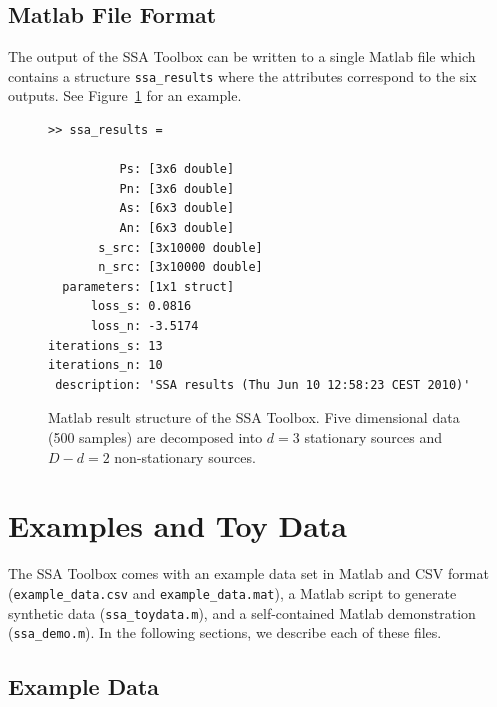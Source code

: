 \documentclass{article}
\newcommand{\1}{\ensuremath{\mathds{1}}}
\newcommand{\0}{\ensuremath{0}}
\begin{document}
\subsection{Matlab File Format}

The output of the SSA Toolbox can be written to a single Matlab file which contains
a structure \texttt{ssa\_results} where the attributes correspond to the six outputs. 
See Figure~\ref{fig:ex_matlab_res} for an example.

\begin{figure}[h]
\centering
\begin{boxedminipage}{12cm}
\begin{verbatim}
>> ssa_results = 

          Ps: [3x6 double]
          Pn: [3x6 double]
          As: [6x3 double]
          An: [6x3 double]
       s_src: [3x10000 double]
       n_src: [3x10000 double]
  parameters: [1x1 struct]
      loss_s: 0.0816
      loss_n: -3.5174
iterations_s: 13
iterations_n: 10
 description: 'SSA results (Thu Jun 10 12:58:23 CEST 2010)'
\end{verbatim}
\end{boxedminipage}
\caption{
Matlab result structure of the SSA Toolbox. Five dimensional data (500 samples) 
are decomposed into $d = 3$ stationary sources and $D-d = 2$ non-stationary sources.
\label{fig:ex_matlab_res}
}
\end{figure}

\FloatBarrier %

\section{Examples and Toy Data}

The SSA Toolbox comes with an example data set in Matlab and CSV format (\texttt{example\_data.csv} and \texttt{example\_data.mat}), a Matlab script to generate synthetic data (\texttt{ssa\_toydata.m}), and a self-contained 
Matlab demonstration (\texttt{ssa\_demo.m}). In the 
following sections, we describe each of these files.

\subsection{Example Data}
\end{document}
